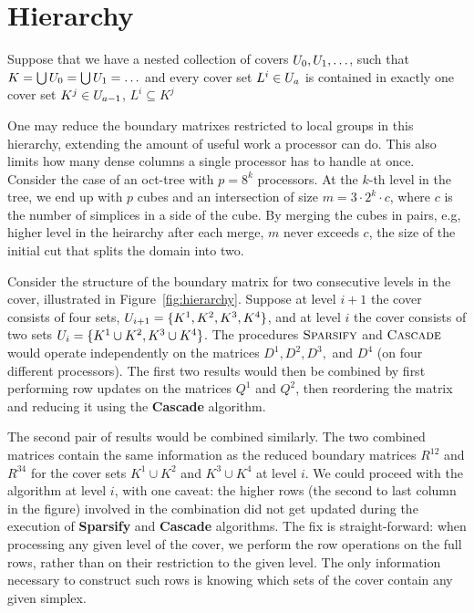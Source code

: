 \section{Hierarchy}
\label{sec:hierarchy}
Suppose that we have a nested collection of
covers $U_0, U_1, \ldots$, such that $K = \bigcup U_0 = \bigcup U_1 = \ldots$
and every cover set $L^i \in U_a$ is contained in exactly one cover set
$K^j \in U_{a-1}$, $L^i \subseteq K^j$

One may reduce the boundary matrixes restricted to local groups in this hierarchy,
extending the amount of useful work a processor can do. This also limits how
many dense columns a single processor has to handle at once.
%
Consider the case of an oct-tree with $p = 8^k$ processors. At the $k$-th level in the
tree, we end up with $p$ cubes and an intersection of size $m = 3 \cdot 2^k \cdot c$,
where $c$ is the number of simplices in a side of the cube. By merging the cubes in pairs, e.g,  higher level
in the heirarchy after each merge, $m$ never exceeds $c$, the size of the
initial cut that splits the domain into two.

Consider the structure of the boundary matrix for two consecutive levels in the
cover, illustrated in Figure~\ref{fig:hierarchy}. Suppose at level $i+1$ the
cover consists of four sets, $U_{i+1} = \{ K^1, K^2, K^3, K^4 \}$, and at level
$i$ the cover consists of two sets $U_i = \{ K^1 \cup K^2, K^3 \cup K^4 \}$.
%
The procedures $\textnormal{\scshape Sparsify}$ and $\textnormal{\scshape Cascade}$ would operate independently
on the matrices $D^1, D^2, D^3,$ and $D^4$ (on four different processors). The first
two results would then be combined by first performing row updates on the matrices $Q^1$ and
$Q^2$, then reordering the matrix and reducing it using the {\bf Cascade}
algorithm.

The second pair of results would be combined similarly.
The two combined matrices contain the same information as the reduced boundary
matrices $R^{12}$ and $R^{34}$ for the cover sets $K^1 \cup K^2$
and $K^3 \cup K^4$ at level $i$. We could proceed with the algorithm at level
$i$, with one caveat: the higher rows (the second to last column in the figure)
involved in the combination did not get updated during the execution of {\bf
Sparsify} and {\bf Cascade} algorithms. The fix is straight-forward: when
processing any given level of the cover, we perform the row operations on the
full rows, rather than on their restriction to the given level.
The only information necessary to construct such rows is knowing which sets of
the cover contain any given simplex.

